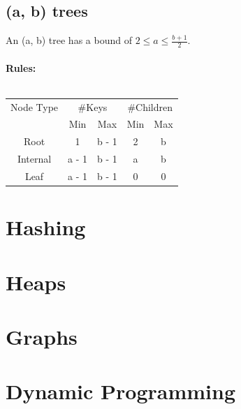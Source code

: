 \documentclass[10pt,landscape,a4paper]{article}
\begin{document}
\begin{multicols*}{4}
\subsection{(a, b) trees}
An (a, b) tree has a bound of $2 \le a \le \frac{b+1}{2}$.\\\\
\textbf{Rules:}\\\\
\begin{tabular}{c|c|c|c|c}

    Node Type   &   \multicolumn{2}{|c|}{\#Keys} &  \multicolumn{2}{|c}{\#Children} \\
    {}          &   Min     &   Max            &    Min     &   Max \\
    \hline
    Root        &   1       &   b - 1           &   2       &   b   \\
    \hline
    Internal    &   a - 1   &   b - 1           &   a       &   b   \\
    \hline
    Leaf        &   a - 1   &   b - 1           &   0       &   0   \\

    
\end{tabular}

\section{Hashing}

\section{Heaps}

\section{Graphs}

\section{Dynamic Programming}
%
%
%
\end{multicols*}
\end{document}
